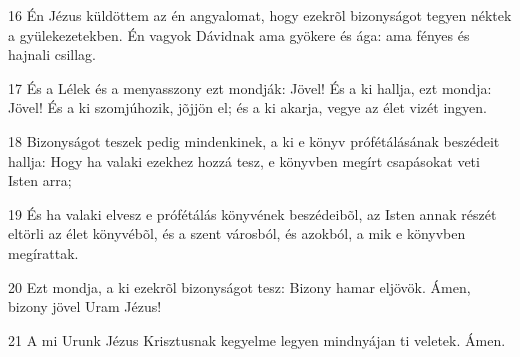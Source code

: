\par 16 Én Jézus küldöttem az én angyalomat, hogy ezekrõl bizonyságot tegyen néktek a gyülekezetekben. Én vagyok Dávidnak ama gyökere  és ága: ama fényes és hajnali csillag.
\par 17 És a Lélek és a menyasszony ezt mondják: Jövel! És a ki hallja, ezt mondja: Jövel! És a ki szomjúhozik, jõjjön el; és a ki akarja, vegye az élet vizét ingyen.
\par 18 Bizonyságot teszek pedig mindenkinek, a ki e könyv prófétálásának beszédeit hallja: Hogy ha valaki ezekhez hozzá tesz, e könyvben megírt csapásokat veti Isten arra;
\par 19 És ha valaki elvesz e prófétálás könyvének beszédeibõl, az Isten annak részét eltörli az élet könyvébõl, és a szent  városból, és azokból, a mik e könyvben megírattak.
\par 20 Ezt mondja, a ki ezekrõl bizonyságot tesz: Bizony hamar eljövök. Ámen, bizony jövel Uram Jézus!
\par 21 A mi Urunk Jézus Krisztusnak kegyelme legyen mindnyájan ti veletek. Ámen.


